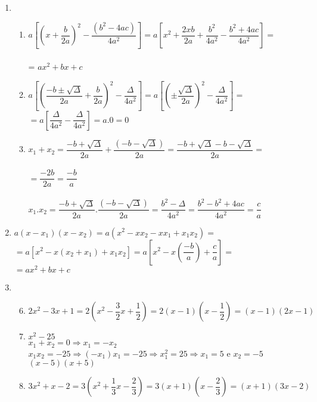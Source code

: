 \begin{enumerate}
\begin{enumerate}
		\end{enumerate}
		\item %
		\begin{enumerate}
			\item %
				$a\left[ \left( x + \dfrac{b}{2a}\right)^2 - \dfrac{\left( b^2 -4ac\right)}{4a^2} \right] = a\left[ x^2 + \dfrac{2xb}{2a} + \dfrac{b^2}{4a^2}- \dfrac{b^2 + 4ac}{4a^2}\right] =$\\\\
				= $\boxed { ax^2 + bx + c}$
			\item %
				$a\left[ \left(\dfrac{-b\pm\sqrt{\Delta}}{2a} + \dfrac{b}{2a}\right)^2 - \dfrac{\Delta}{4a^2}\right] = a\left[\left(\pm\dfrac{\sqrt{\Delta}}{2a}\right)^2 -\dfrac{\Delta}{4a^2}\right]=$\\
				$=a\left[\dfrac{\Delta}{4a^2}- \dfrac{\Delta}{4a^2}\right] = a.0 = \boxed{0}$
			\item %
				$x_{1} + x_{2} = \dfrac{-b+\sqrt{\Delta}}{2a} + \dfrac{(-b-\sqrt{\Delta})}{2a} = \dfrac{-b+\sqrt{\Delta}-b-\sqrt{\Delta}}{2a} = $\\\\
				$=\dfrac{-2b}{2a}=\boxed{\dfrac{-b}{a}}$\\\\
				$x_{1}.x_{2} = \dfrac{-b+\sqrt{\Delta}}{2a}.\dfrac{(-b-\sqrt{\Delta})}{2a} = \dfrac{b^2-\Delta}{4a^2} = \dfrac{b^2-b^2+4ac}{4a^2} = \boxed{\dfrac{c}{a}}$
		\end{enumerate}
		\item %
		$a(x-x_{1})(x-x_{2}) = a(x^2 - xx_{2} - xx_{1} +x_{1}x_{2}) = $\\
		$ = a[x^2 - x(x_{2} + x_{1}) + x_{1}x_{2}] = a\left[x^2 - x\left(\dfrac{-b}{a}\right) + \dfrac{c}{a}\right] =$\\ $
		= \boxed{ax^2+bx+c}$
		\item %
		\begin{enumerate}
			\setcounter{enumii}{5}
				\item %
				$2x^2-3x+1=2(x^2-\dfrac{3}{2}x+\dfrac{1}{2}) = 2(x-1)(x-\dfrac{1}{2})=\boxed{(x-1)(2x-1)}$
				\item %
				$x^2 - 25$\\
				$x_{1} + x_{2} = 0 \Rightarrow x_{1} = -x_{2}$\\
				$x_{1}x_{2} = -25 \Rightarrow (-x_{1})x_{1} = -25 \Rightarrow x_{1}^2 = 25 \Rightarrow x_{1} = 5$ e $x_{2} = -5$\\
				$\boxed{(x - 5)(x + 5)}$
				\item %
				$3x^2 + x - 2 = 3(x^2+\dfrac{1}{3}x-\dfrac{2}{3}) = 3(x+1)(x-\dfrac{2}{3})=\boxed{(x+1)(3x-2)}$\\
				

\end{enumerate}
\end{enumerate}
